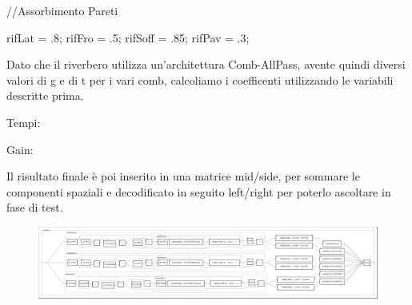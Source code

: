 \begin{code}
//Assorbimento Pareti

rifLat = .8;
rifFro = .5;
rifSoff = .85;
rifPav = .3;
\end{code}

Dato che il riverbero utilizza un'architettura Comb-AllPass, avente quindi diversi valori di g e di t
per i vari comb, calcoliamo i coefficenti utilizzando le variabili descritte prima.

\bigskip

Tempi:



Gain:



\pagebreak

Il risultato finale è poi inserito in una matrice mid/side, per sommare le componenti spaziali
e decodificato in seguito left/right per poterlo ascoltare in fase di test.




\begin{figure}[htp]
\centering
\includegraphics[width=1\textwidth]{Code/atmoverb-svg/process.pdf}
\label{fig:atmoverb}
\end{figure}
